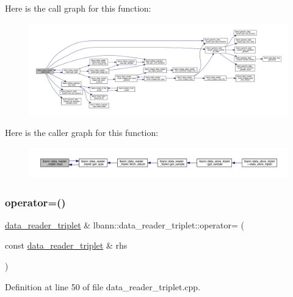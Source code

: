 Here is the call graph for this function\+:\nopagebreak
\begin{figure}[H]
\begin{center}
\leavevmode
\includegraphics[width=350pt]{classlbann_1_1data__reader__triplet_a2601234d6d501df6170c6fb60dfb873e_cgraph}
\end{center}
\end{figure}
Here is the caller graph for this function\+:\nopagebreak
\begin{figure}[H]
\begin{center}
\leavevmode
\includegraphics[width=350pt]{classlbann_1_1data__reader__triplet_a2601234d6d501df6170c6fb60dfb873e_icgraph}
\end{center}
\end{figure}
\mbox{\label{classlbann_1_1data__reader__triplet_a096c73a8b3d163faadfee3b9d14fc842}} 
\subsubsection{\texorpdfstring{operator=()}{operator=()}}
{\footnotesize\ttfamily \hyperlink{classlbann_1_1data__reader__triplet}{data\+\_\+reader\+\_\+triplet} \& lbann\+::data\+\_\+reader\+\_\+triplet\+::operator= (\begin{DoxyParamCaption}\item[{const \hyperlink{classlbann_1_1data__reader__triplet}{data\+\_\+reader\+\_\+triplet} \&}]{rhs }\end{DoxyParamCaption})}



Definition at line 50 of file data\+\_\+reader\+\_\+triplet.\+cpp.


